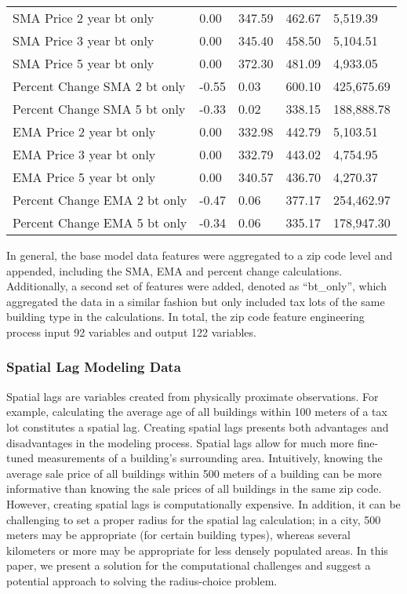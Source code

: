 \documentclass[12pt,]{article}
\begin{document}
\begin{table}
{\begin{tabular}[t]{lllll}
\addlinespace
SMA Price 2 year bt only & 0.00 & 347.59 & 462.67 & 5,519.39\\
SMA Price 3 year bt only & 0.00 & 345.40 & 458.50 & 5,104.51\\
SMA Price 5 year bt only & 0.00 & 372.30 & 481.09 & 4,933.05\\
Percent Change SMA 2 bt only & -0.55 & 0.03 & 600.10 & 425,675.69\\
Percent Change SMA 5 bt only & -0.33 & 0.02 & 338.15 & 188,888.78\\
\addlinespace
EMA Price 2 year bt only & 0.00 & 332.98 & 442.79 & 5,103.51\\
EMA Price 3 year bt only & 0.00 & 332.79 & 443.02 & 4,754.95\\
EMA Price 5 year bt only & 0.00 & 340.57 & 436.70 & 4,270.37\\
Percent Change EMA 2 bt only & -0.47 & 0.06 & 377.17 & 254,462.97\\
Percent Change EMA 5 bt only & -0.34 & 0.06 & 335.17 & 178,947.30\\
\bottomrule
\end{tabular}}
\end{table}

In general, the base model data features were aggregated to a zip code
level and appended, including the SMA, EMA and percent change
calculations. Additionally, a second set of features were added, denoted
as ``bt\_only'', which aggregated the data in a similar fashion but only
included tax lots of the same building type in the calculations. In
total, the zip code feature engineering process input 92 variables and
output 122 variables.

\hypertarget{spatial-lag-modeling-data}{%
\subsubsection{Spatial Lag Modeling
Data}\label{spatial-lag-modeling-data}}

Spatial lags are variables created from physically proximate
observations. For example, calculating the average age of all buildings
within 100 meters of a tax lot constitutes a spatial lag. Creating
spatial lags presents both advantages and disadvantages in the modeling
process. Spatial lags allow for much more fine-tuned measurements of a
building's surrounding area. Intuitively, knowing the average sale price
of all buildings within 500 meters of a building can be more informative
than knowing the sale prices of all buildings in the same zip code.
However, creating spatial lags is computationally expensive. In
addition, it can be challenging to set a proper radius for the spatial
lag calculation; in a city, 500 meters may be appropriate (for certain
building types), whereas several kilometers or more may be appropriate
for less densely populated areas. In this paper, we present a solution
for the computational challenges and suggest a potential approach to
solving the radius-choice problem.
\end{document}
